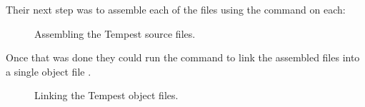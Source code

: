 Their next step was to assemble each of the files using the  command on each:
\begin{figure}[H]
      \centering
    \caption{Assembling the Tempest source files.}
\end{figure}

Once that was done they could run the  command to link the assembled files into a
single object file .
\begin{figure}[H]
      \centering
    \caption{Linking the Tempest object files.}
\end{figure}

